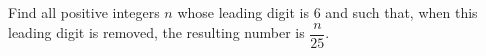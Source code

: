 Find all positive integers $n$ whose leading digit is $6$ and such that, when this leading digit is removed, the resulting number is $\dfrac{n}{25}$.
